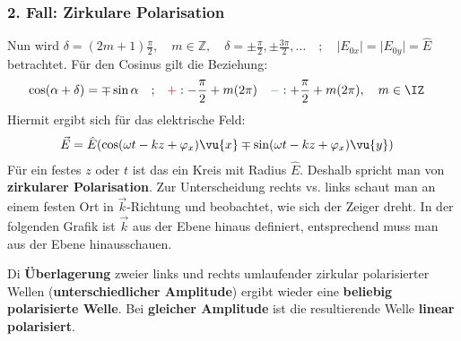   \subsubsection{2. Fall: Zirkulare Polarisation}
		  Nun wird \(\delta = (2m+1) \frac{\pi}{2}, \quad m \in \mathbb{Z} , \quad\delta = \pm \frac{\pi}{2}, \pm \frac{3\pi}{2},\ldots \quad ;\quad\vert E_{0x} \vert = \vert E_{0y} \vert = \hat{E} \) betrachtet. Für den Cosinus gilt die Beziehung:
		        \begin{equation}\begin{split}
				        \begin{split}
					        \cos ( \alpha + \delta ) = \mp \sin \alpha \quad;\quad &\textcolor{red}{+} :   -\frac{\pi}{2} + m (2\pi) \quad\textcolor{green!70}{-} :    +\frac{\pi}{2} + m (2 \pi), \quad m \in \IZ
				        \end{split}
			        \end{split}\end{equation}
		  Hiermit ergibt sich für das elektrische Feld:
		        \begin{equation}\begin{split}
				        \vec{E} &= \hat{E}(\cos(\omega t -  k z + \varphi_x)\vu{x} \mp \sin (\omega t -  k z + \varphi_x)\vu{y})
			        \end{split}\end{equation}
		  Für ein festes \(z\) oder \(t\) ist das ein Kreis mit Radius \(\hat{E}\). Deshalb spricht man von \textbf{zirkularer Polarisation}. Zur Unterscheidung rechts vs. links schaut man an einem festen Ort in $\vec{k}$-Richtung und beobachtet, wie sich der Zeiger dreht. In der folgenden Grafik ist $\vec{k}$ aus der Ebene hinaus definiert, entsprechend muss man aus der Ebene hinausschauen.
		        \begin{center}
			        
		        \end{center}

		  Di \textbf{Überlagerung} zweier links und rechts umlaufender zirkular polarisierter Wellen (\textbf{unterschiedlicher Amplitude}) ergibt wieder eine \textbf{beliebig polarisierte Welle}. Bei \textbf{gleicher Amplitude} ist die resultierende Welle \textbf{linear polarisiert}.
